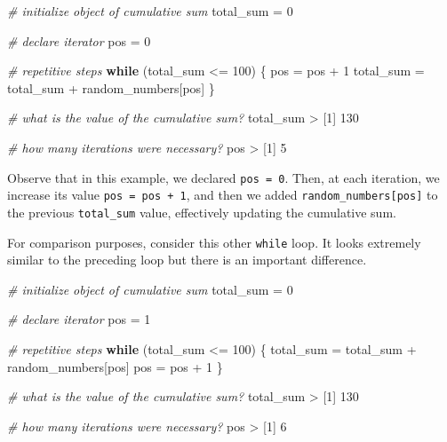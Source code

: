 \documentclass[
]{book}
\newenvironment{Shaded}{\begin{snugshade}}{\end{snugshade}}
\newcommand{\CommentTok}[1]{\textcolor[rgb]{0.56,0.35,0.01}{\textit{#1}}}
\newcommand{\ControlFlowTok}[1]{\textcolor[rgb]{0.13,0.29,0.53}{\textbf{#1}}}
\newcommand{\DecValTok}[1]{\textcolor[rgb]{0.00,0.00,0.81}{#1}}
\newcommand{\NormalTok}[1]{#1}
\newcommand{\OtherTok}[1]{\textcolor[rgb]{0.56,0.35,0.01}{#1}}
\newcommand{\SpecialCharTok}[1]{\textcolor[rgb]{0.00,0.00,0.00}{#1}}
\begin{document}
\begin{Shaded}
\begin{Highlighting}[]
\CommentTok{\# initialize object of cumulative sum}
\NormalTok{total\_sum }\OtherTok{=} \DecValTok{0}

\CommentTok{\# declare iterator}
\NormalTok{pos }\OtherTok{=} \DecValTok{0}

\CommentTok{\# repetitive steps}
\ControlFlowTok{while}\NormalTok{ (total\_sum }\SpecialCharTok{\textless{}=} \DecValTok{100}\NormalTok{) \{}
\NormalTok{  pos }\OtherTok{=}\NormalTok{ pos }\SpecialCharTok{+} \DecValTok{1}
\NormalTok{  total\_sum }\OtherTok{=}\NormalTok{ total\_sum }\SpecialCharTok{+}\NormalTok{ random\_numbers[pos]}
\NormalTok{\}}

\CommentTok{\# what is the value of the cumulative sum?}
\NormalTok{total\_sum}
\SpecialCharTok{\textgreater{}}\NormalTok{ [}\DecValTok{1}\NormalTok{] }\DecValTok{130}

\CommentTok{\# how many iterations were necessary?}
\NormalTok{pos}
\SpecialCharTok{\textgreater{}}\NormalTok{ [}\DecValTok{1}\NormalTok{] }\DecValTok{5}
\end{Highlighting}
\end{Shaded}

Observe that in this example, we declared \texttt{pos\ =\ 0}. Then, at each iteration,
we increase its value \texttt{pos\ =\ pos\ +\ 1}, and then we added \texttt{random\_numbers{[}pos{]}}
to the previous \texttt{total\_sum} value, effectively updating the cumulative sum.

For comparison purposes, consider this other \texttt{while} loop. It looks extremely
similar to the preceding loop but there is an important difference.

\begin{Shaded}
\begin{Highlighting}[]
\CommentTok{\# initialize object of cumulative sum}
\NormalTok{total\_sum }\OtherTok{=} \DecValTok{0}

\CommentTok{\# declare iterator}
\NormalTok{pos }\OtherTok{=} \DecValTok{1}

\CommentTok{\# repetitive steps}
\ControlFlowTok{while}\NormalTok{ (total\_sum }\SpecialCharTok{\textless{}=} \DecValTok{100}\NormalTok{) \{}
\NormalTok{  total\_sum }\OtherTok{=}\NormalTok{ total\_sum }\SpecialCharTok{+}\NormalTok{ random\_numbers[pos]}
\NormalTok{  pos }\OtherTok{=}\NormalTok{ pos }\SpecialCharTok{+} \DecValTok{1}
\NormalTok{\}}

\CommentTok{\# what is the value of the cumulative sum?}
\NormalTok{total\_sum}
\SpecialCharTok{\textgreater{}}\NormalTok{ [}\DecValTok{1}\NormalTok{] }\DecValTok{130}

\CommentTok{\# how many iterations were necessary?}
\NormalTok{pos}
\SpecialCharTok{\textgreater{}}\NormalTok{ [}\DecValTok{1}\NormalTok{] }\DecValTok{6}
\end{Highlighting}
\end{Shaded}
\end{document}
